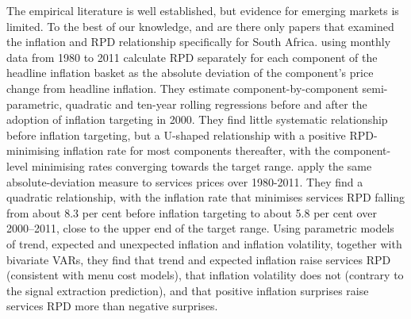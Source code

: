 \documentclass[
  letterpaper,
  DIV=11,
  numbers=noendperiod]{scrartcl}
\begin{document}
The empirical literature is well established, but evidence for emerging
markets is limited. To the best of our knowledge, \citet{ndou2014} and
\citet{ndou2017} are there only papers that examined the inflation and
RPD relationship specifically for South Africa. \citet{ndou2014} using
monthly data from 1980 to 2011 calculate RPD separately for each
component of the headline inflation basket as the absolute deviation of
the component's price change from headline inflation. They estimate
component-by-component semi-parametric, quadratic and ten-year rolling
regressions before and after the adoption of inflation targeting in
2000. They find little systematic relationship before inflation
targeting, but a U-shaped relationship with a positive RPD-minimising
inflation rate for most components thereafter, with the component-level
minimising rates converging towards the target range. \citet{ndou2017}
apply the same absolute-deviation measure to services prices over
1980-2011. They find a quadratic relationship, with the inflation rate
that minimises services RPD falling from about 8.3 per cent before
inflation targeting to about 5.8 per cent over 2000--2011, close to the
upper end of the target range. Using parametric models of trend,
expected and unexpected inflation and inflation volatility, together
with bivariate VARs, they find that trend and expected inflation raise
services RPD (consistent with menu cost models), that inflation
volatility does not (contrary to the signal extraction prediction), and
that positive inflation surprises raise services RPD more than negative
surprises.
\end{document}
